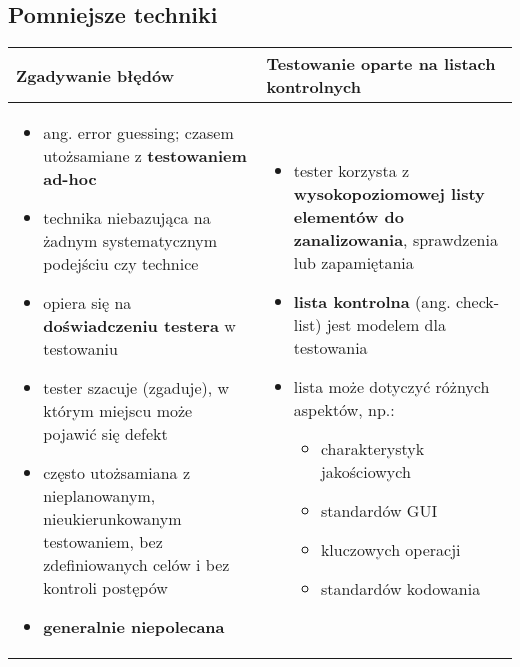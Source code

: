 \documentclass[../main.tex]{subfiles}
\begin{document}
    \subsection{Pomniejsze techniki}

    \begin{table}[H]
        \begin{center}
            \begin{tabular}{| p{8cm} | p{8cm} |}
                \hline
                \textbf{Zgadywanie błędów} & \textbf{Testowanie oparte na listach kontrolnych}\\
                \hline
                \begin{itemize}
                    \item ang. error guessing; czasem utożsamiane z \textbf{testowaniem ad-hoc}
                    \item technika niebazująca na żadnym systematycznym podejściu czy technice
                    \item opiera się na \textbf{doświadczeniu testera} w testowaniu
                    \item tester szacuje (zgaduje), w którym miejscu może pojawić się defekt
                    \item często utożsamiana z nieplanowanym, nieukierunkowanym testowaniem, bez zdefiniowanych celów i bez kontroli postępów
                    \item \textbf{generalnie niepolecana}
                \end{itemize}
                &
                \begin{itemize}
                    \item tester korzysta z \textbf{wysokopoziomowej listy elementów do
                    zanalizowania}, sprawdzenia lub zapamiętania
                    \item \textbf{lista kontrolna} (ang. check-list) jest modelem dla testowania
                    \item lista może dotyczyć różnych aspektów, np.:
                    \begin{itemize}
                        \item charakterystyk jakościowych
                        \item standardów GUI
                        \item kluczowych operacji
                        \item standardów kodowania
                    \end{itemize}

\end{itemize}
\end{tabular}
\end{center}
\end{table}
\end{document}

